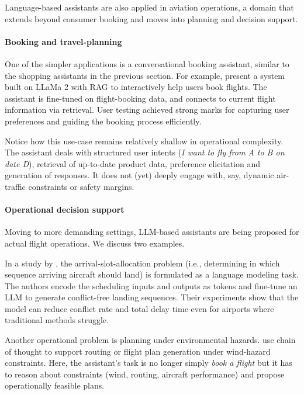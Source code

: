 Language-based assistants are also applied in aviation operations, a domain that extends beyond consumer booking and moves into planning and decision support.

\paragraph{Booking and travel-planning}
One of the simpler applications is a conversational booking assistant, similar to the shopping assistants in the previous section. For example, \citet{manasa2024towards} present a system built on LLaMa 2 with RAG to interactively help users book flights. The assistant is fine-tuned on flight-booking data, and connects to current flight information via retrieval. User testing achieved strong marks for capturing user preferences and guiding the booking process efficiently. 

Notice how this use-case remains relatively shallow in operational complexity. The assistant deals with structured user intents ({\em I want to fly from A to B on date D}), retrieval of up-to-date product data, preference elicitation and generation of responses. It does not (yet) deeply engage with, say, dynamic air-traffic constraints or safety margins.

\paragraph{Operational decision support}
Moving to more demanding settings, LLM-based assistants are  being proposed for actual flight operations. We discuss two examples.

In a study by \citet{zhou2024flight}, the arrival-slot-allocation problem (i.e., determining in which sequence arriving aircraft should land) is formulated as a language modeling task. The authors encode the scheduling inputs and outputs as tokens and fine-tune an LLM to generate conflict-free landing sequences. Their experiments show that the model can reduce conflict rate and total delay time even for airports where traditional methods struggle.

Another operational problem is planning under environmental hazards. \citet{tabrizian2024using} use chain of thought to support routing or flight plan generation under wind-hazard constraints. Here, the assistant’s task is no longer simply {\em book a flight} but it has to reason about constraints (wind, routing, aircraft performance) and propose operationally feasible plans. 

